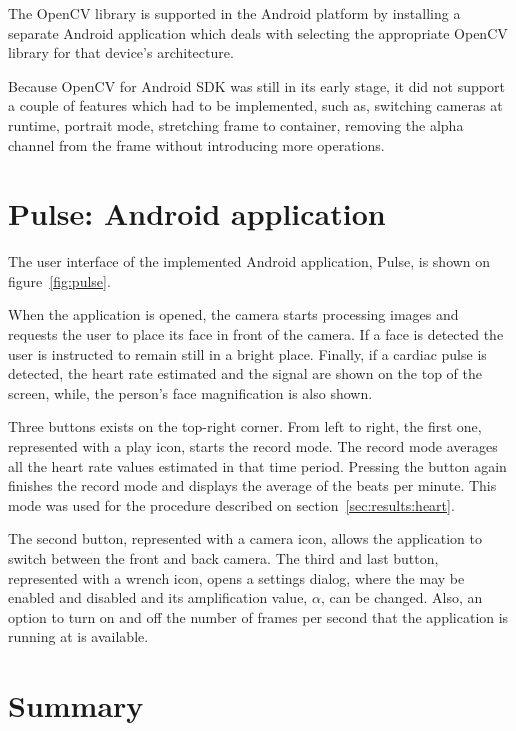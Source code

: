 The OpenCV library is supported in the Android platform by installing
a separate Android application which deals with selecting the appropriate
OpenCV library for that device's architecture.

Because OpenCV for Android SDK was still in its early stage, it did not support
a couple of features which had to be implemented, such as, switching cameras at
runtime, portrait mode, stretching frame to container, removing the alpha
channel from the frame without introducing more operations.

\section{Pulse: Android application} \label{sec:impl:app}


The user interface of the implemented Android application, Pulse, is shown on
figure~\ref{fig:pulse}.

When the application is opened, the camera starts processing images and
requests the user to place its face in front of the camera. If a face is
detected the user is instructed to remain still in a bright place. Finally,
if a cardiac pulse is detected, the heart rate estimated and the signal
are shown on the top of the screen, while, the person's face magnification
is also shown.

Three buttons exists on the top-right corner. From left to right, the first
one, represented with a play icon, starts the record mode. The record mode
averages all the heart rate values estimated in that time period. Pressing the
button again finishes the record mode and displays the average of the
beats per minute. This mode was used for the procedure described on
section~\ref{sec:results:heart}.

The second button, represented with a camera icon, allows the application
to switch between the front and back camera. The third and last button,
represented with a wrench icon, opens a settings dialog, where the
\evm{} may be enabled and disabled and its amplification value, $\alpha$,
can be changed. Also, an option to turn on and off the number of
frames per second that the application is running at is available.

\section{Summary}

